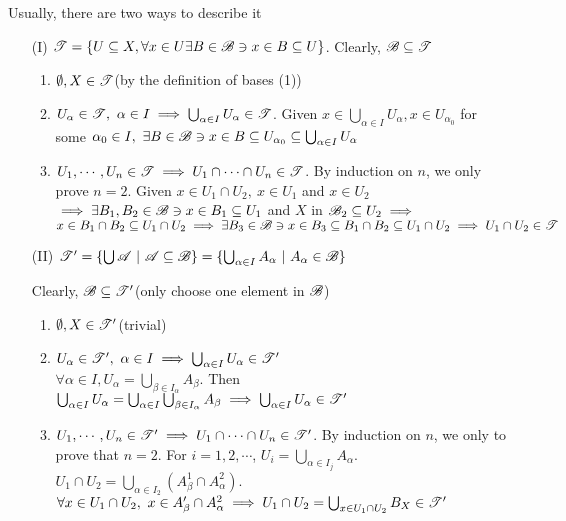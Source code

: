 Usually, there are two ways to describe it

\begin{enumerate}[wide]
	\item[(I)] $\mathscr{T} = \{U \subseteq X , \forall x \in U \exists B \in \mathscr{B} \ni x \in B \subseteq U\}$. Clearly, $\mathscr{B} \subseteq \mathscr{T}$
	
	\begin{enumerate}
		\item $\emptyset , X \in \mathscr{T}$(by the definition of bases (1))
		\item $U_{\alpha} \in \mathscr{T},~\alpha \in I \implies \bigcup_{\alpha \in I}U_{\alpha} \in \mathscr{T}$. Given $x \in \bigcup_{\alpha \in I}U_{\alpha},x \in U_{\alpha_0}$ for some $\alpha_0 \in I,~\exists B \in \mathscr{B} \ni x \in B \subseteq U_{\alpha_0} \subseteq \bigcup_{\alpha \in I}U_{\alpha}$
		\item $U_1,\cdots,U_n \in \mathscr{T} \implies U_1 \cap \cdots \cap U_n \in \mathscr{T}$. By induction on $n$, we only prove $n=2$. Given $x \in U_1 \cap U_2,~x \in U_1$ and $x \in U_2$\\
		$\implies \exists B_1,B_2 \in \mathscr{B} \ni x \in B_1 \subseteq U_1$ and $X$ in $ \mathscr{B}_2 \subseteq U_2 \implies$\\
		$x \in B_1 \cap B_2 \subseteq U_1 \cap U_2 \implies \exists B_3 \in \mathscr{B} \ni x \in B_3 \subseteq B_1 \cap B_2 \subseteq U_1 \cap U_2 \implies U_1 \cap U_2 \in \mathscr{T}$
	\end{enumerate}
	
	\item[(II)]  $\mathscr{T}' = \{\bigcup\mathscr{A} ~|~ \mathscr{A} \subseteq \mathscr{B}\} = \{\bigcup_{\alpha \in I}A_{\alpha} ~|~ A_{\alpha} \in \mathscr{B}\}$
	
	Clearly, $\mathscr{B} \subseteq \mathscr{T}'$(only choose one element in $\mathscr{B}$)
	
	\begin{enumerate}
		\item $\emptyset,X \in \mathscr{T}'$(trivial)
		\item $U_{\alpha} \in \mathscr{T}',~\alpha \in I \implies \bigcup_{\alpha \in I}U_{\alpha} \in \mathscr{T}'$\\
		$\forall \alpha \in I,U_{\alpha} = \bigcup_{\beta \in I_{\alpha}}A_{\beta}$. Then $\bigcup_{\alpha \in I}U_{\alpha} = \bigcup_{\alpha \in I}\bigcup_{\beta \in I_{\alpha}}A_{\beta} \implies \bigcup_{\alpha \in I}U_{\alpha} \in \mathscr{T}'$
		\item $U_1,\cdots,U_n \in \mathscr{T}' \implies U_1 \cap \cdots \cap U_n \in \mathscr{T}'$. By induction on $n$, we only to prove that $n = 2$. For $i=1,2,\cdots$, $U_i = \bigcup_{\alpha \in I_j}A_{\alpha}$.\\
		$U_1 \cap U_2 = \bigcup_{\alpha \in I_2}(A_{\beta}^1 \cap A_{\alpha}^2) $. $\forall x \in U_1 \cap U_2,~ x \in A'_{\beta} \cap A_{\alpha}^2 \implies U_1 \cap U_2 = \bigcup_{x \in U_1 \cap U_2}B_X \in \mathscr{T}'$
	\end{enumerate}
	

\end{enumerate}
